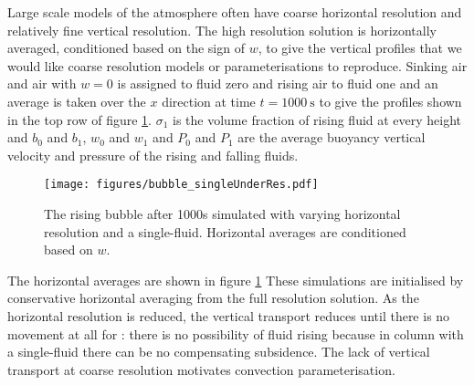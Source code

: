 \documentclass[draft]{agujournal2019}
\begin{document}
{Large scale models of the atmosphere often have coarse horizontal resolution and relatively fine vertical resolution. The high resolution solution is horizontally averaged, conditioned based on the sign of $w$, to give the vertical profiles that we would like coarse resolution models or parameterisations to reproduce. Sinking air and air with $w=0$ is assigned to fluid zero and rising air to fluid one and an average is taken over the $x$ direction at time $t=1000\ \text{s}$ to give the profiles}
shown in the top row of figure \ref{fig:bubble_singleUnderRes}.
$\sigma_{1}$ is the volume fraction of rising fluid at every height and $b_{0}$ and $b_{1}$, $w_{0}$ and $w_{1}$ and $P_{0}$ and $P_{1}$
are the average buoyancy vertical velocity and pressure of the rising and falling fluids. 

\begin{figure}
\noindent \begin{centering}
\texttt{[image: figures/bubble\_singleUnderRes.pdf]}
\par\end{centering}
\caption{The rising bubble after 1000s simulated with varying horizontal resolution
and a single-fluid. Horizontal averages are conditioned based on $w$.
\label{fig:bubble_singleUnderRes}}
\end{figure}

The  horizontal averages  are shown in figure \ref{fig:bubble_singleUnderRes}
These simulations are initialised by conservative
horizontal averaging from the full resolution solution. As the horizontal
resolution is reduced, the vertical transport reduces until there
is no movement at all for : there is no possibility
of fluid rising because in  column with a single-fluid there can be no compensating subsidence. The lack of vertical transport
at coarse resolution motivates convection parameterisation. 
\end{document}
